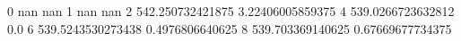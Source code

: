 0 nan nan
1 nan nan
2 542.250732421875 3.22406005859375
4 539.0266723632812 0.0
6 539.5243530273438 0.4976806640625
8 539.703369140625 0.67669677734375

